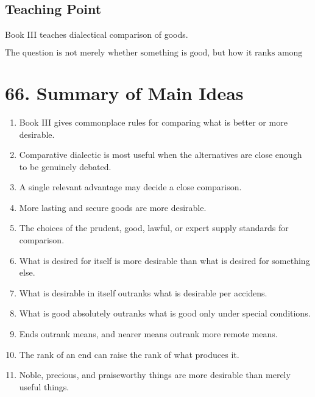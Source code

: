 \documentclass[12pt]{article}
\begin{document}
\subsection*{Teaching Point}

Book III teaches dialectical comparison of goods.

\[
\boxed{
\text{The question is not merely whether something is good, but how it ranks among goods.}
}
\]

\section*{66. Summary of Main Ideas}

\begin{enumerate}[itemsep=0.5em]
    \item Book III gives commonplace rules for comparing what is better or more
    desirable.

    \item Comparative dialectic is most useful when the alternatives are close
    enough to be genuinely debated.

    \item A single relevant advantage may decide a close comparison.

    \item More lasting and secure goods are more desirable.

    \item The choices of the prudent, good, lawful, or expert supply standards
    for comparison.

    \item What is desired for itself is more desirable than what is desired for
    something else.

    \item What is desirable in itself outranks what is desirable per accidens.

    \item What is good absolutely outranks what is good only under special
    conditions.

    \item Ends outrank means, and nearer means outrank more remote means.

    \item The rank of an end can raise the rank of what produces it.

    \item Noble, precious, and praiseworthy things are more desirable than
    merely useful things.


\end{enumerate}
\end{document}
